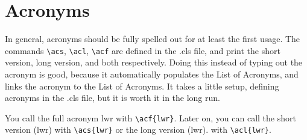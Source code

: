 \section{Acronyms}
In general, acronyms should be fully spelled out for at least the first usage. The commands \verb=\acs=, \verb=\acl=, \verb=\acf= are defined in the .cls file, and print the short version, long version, and both respectively. Doing this instead of typing out the acronym is good, because it automatically populates the List of Acronyms, and links the acronym to the List of Acronyms. It takes a little setup, defining acronyms in the .cls file, but it is worth it in the long run.

You call the full acronym \acf{lwr} with \verb=\acf{lwr}=. Later on, you can call the short version (\acs{lwr}) with \verb=\acs{lwr}= or the long version (\acl{lwr}). with \verb=\acl{lwr}=.